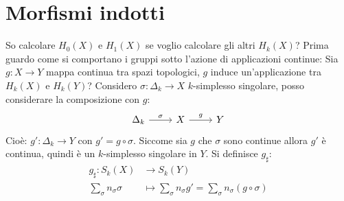 \documentclass[10pt, twoside=false, x11names]{scrbook}
\renewcommand{\phi}{\varphi}
\newcommand{\Id}[1][]{\mathbb{I}_#1}
\newcommand*\quot[2]{{^{\textstyle #1}\big/_{\textstyle #2}}}
\begin{document}
\section{Morfismi indotti}

So calcolare $ H_0(X) $ e $ H_1(X) $ se voglio calcolare
gli altri $ H_k(X) $? Prima guardo come si comportano i gruppi sotto
l'azione di applicazioni continue:
Sia $ g \colon X \to Y $ mappa continua tra spazi topologici,
$ g $ induce un'applicazione tra $ H_k(X) $ e $ H_k(Y) $?
Considero $ \sigma \colon \Delta_k \to X $ $ k $-simplesso singolare, posso
considerare la composizione con $ g $:
\[
  \begin{tikzcd}
    \Delta_k \arrow{r}{\sigma} &  X  \arrow{r}{g} & Y
  \end{tikzcd}
\]
Cioè: $ g' \colon \Delta_k \to Y $ con $ g' = g \circ \sigma $. Siccome sia
$ g $ che $ \sigma $ sono continue allora $ g' $ è continua, quindi è un
$ k $-simplesso singolare in $ Y $.
Si definisce $ g_\sharp $:
\begin{align*}
  g_\sharp \colon S_k(X) & \to S_k(Y) \\
  \sum_\sigma n_\sigma \sigma & \mapsto  \sum_\sigma n_\sigma g' =  \sum_\sigma n_\sigma ( g \circ \sigma )
\end{align*}
\end{document}
